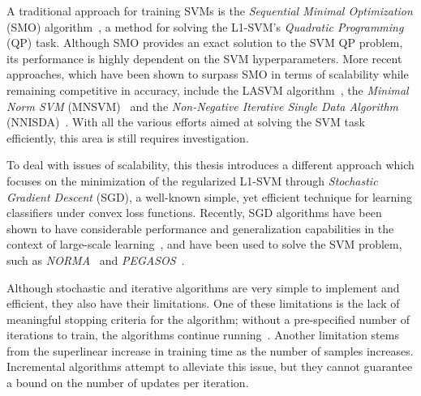 \documentclass[reqno]{vcuthesis}
\numberwithin{equation}{chapter}
\begin{document}
A traditional approach for training SVMs is the \textit{Sequential Minimal Optimization} (SMO) algorithm~\cite{Platt1998}, a method for solving the L1-SVM's \textit{Quadratic Programming} (QP) task. Although SMO provides an exact solution to the SVM QP problem, its performance is highly dependent on the SVM hyperparameters. More recent approaches, which have been shown to surpass SMO in terms of scalability while remaining competitive in accuracy, include the LASVM algorithm~\cite{bordes2005fast}, the \textit{Minimal Norm SVM} (MNSVM)~\cite{strack2013geometric} and the \textit{Non-Negative Iterative Single Data Algorithm} (NNISDA)~\cite{Kecman2014,zigic2016}. With all the various efforts aimed at solving the SVM task efficiently, this area is still requires investigation.

To deal with issues of scalability, this thesis introduces a different approach which focuses on the minimization of the regularized L1-SVM through \textit{Stochastic Gradient Descent} (SGD), a well-known simple, yet efficient technique for learning classifiers under convex loss functions. Recently, SGD algorithms have been shown to have considerable performance and generalization capabilities in the context of large-scale learning~\cite{bottou2010large}, and have been used to solve the SVM problem, such as \textit{NORMA}~\cite{kivinen2004online} and \textit{PEGASOS}~\cite{shalev2011pegasos,zhang2004solving}. 

Although stochastic and iterative algorithms are very simple to implement and efficient, they also have their limitations. One of these limitations is the lack of meaningful stopping criteria for the algorithm; without a pre-specified number of iterations to train, the algorithms continue running~\cite{panagiotakopoulos2013stochastic}. Another limitation stems from the superlinear increase in training time as the number of samples increases. Incremental algorithms attempt to alleviate this issue, but they cannot guarantee a bound on the number of updates per iteration. 
\end{document}
